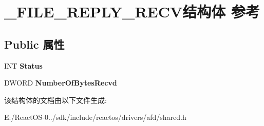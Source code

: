 \hypertarget{struct___f_i_l_e___r_e_p_l_y___r_e_c_v}{}\section{\+\_\+\+F\+I\+L\+E\+\_\+\+R\+E\+P\+L\+Y\+\_\+\+R\+E\+C\+V结构体 参考}
\label{struct___f_i_l_e___r_e_p_l_y___r_e_c_v}
\subsection*{Public 属性}
\begin{DoxyCompactItemize}
\item 
\mbox{\label{struct___f_i_l_e___r_e_p_l_y___r_e_c_v_a0d3e7ecf44f3d7c20c555a10a9475b89}} 
I\+NT {\bfseries Status}
\item 
\mbox{\label{struct___f_i_l_e___r_e_p_l_y___r_e_c_v_ac66a75fc0fdfe7f890c7e6af585eb8cb}} 
D\+W\+O\+RD {\bfseries Number\+Of\+Bytes\+Recvd}
\end{DoxyCompactItemize}


该结构体的文档由以下文件生成\+:\begin{DoxyCompactItemize}
\item 
E\+:/\+React\+O\+S-\/0../sdk/include/reactos/drivers/afd/shared.\+h\end{DoxyCompactItemize}
